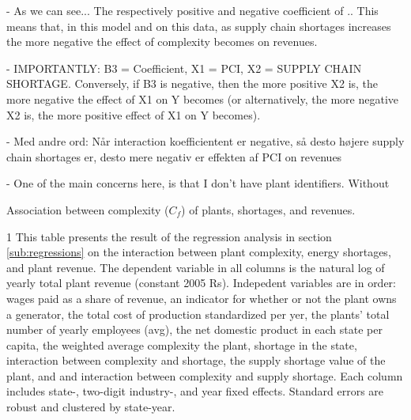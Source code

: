 \documentclass[11pt]{article}
\begin{document}
- As we can see... The respectively positive and negative coefficient of  .. 
This means that, in this model and on this data, as supply chain shortages increases the more negative the effect of complexity becomes on revenues.

- IMPORTANTLY: B3 = Coefficient, X1 = PCI, X2 = SUPPLY CHAIN SHORTAGE.
Conversely, if B3 is negative, then the more positive X2 is, the more negative the effect of X1 on Y becomes (or alternatively, the more negative X2 is, the more positive effect of X1 on Y becomes). 

- Med andre ord: Når interaction koefficientent er negative, så desto højere supply chain shortages er, desto mere negativ er effekten af PCI on revenues

- One of the main concerns here, is that I don't have plant identifiers. Without 

\begin{sidewaystable}
	\begin{center}
		\begin{threeparttable}
		\caption{Association between complexity ($C_{f}$) of plants, shortages, and revenues.}
			\label{tab:interaction_avg_pci}
			
			\begin{tablenotes} \footnotesize
			\item[1] This table presents the result of the regression analysis in section \ref{sub:regressions} on the interaction between plant complexity, energy shortages, and plant revenue. The dependent variable in all columns is the natural log of yearly total plant revenue (constant 2005 Rs). Indepedent variables are in order: wages paid as a share of revenue, an indicator for whether or not the plant owns a generator, the total cost of production standardized per yer, the plants' total number of yearly employees (avg), the net domestic product in each state per capita, the weighted average complexity the plant, shortage in the state, interaction between complexity and shortage, the supply shortage value of the plant, and and interaction between complexity and supply shortage. Each column includes state-, two-digit industry-, and year fixed effects. Standard errors are robust and clustered by state-year.
			\end{tablenotes}
		\end{threeparttable}
	\end{center}
\end{sidewaystable}
\end{document}
